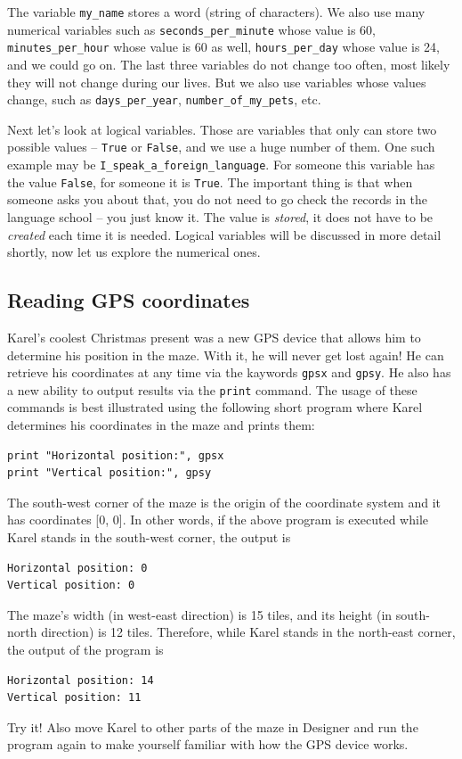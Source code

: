 The variable {\tt my\_name} stores a word (string of characters). We also use many numerical variables such as
{\tt seconds\_per\_minute} whose value is 60, {\tt minutes\_per\_hour} whose value is 60 as well, 
{\tt hours\_per\_day} whose value is 24, and we could go on. The last three variables do not change 
too often, most likely they will not change during our lives. But we also use variables whose 
values change, such as {\tt days\_per\_year}, {\tt number\_of\_my\_pets}, etc.

Next let's look at logical variables. Those are variables that only can store two possible values --
{\tt True} or {\tt False}, and we use a huge number of them. One such example may be {\tt I\_speak\_a\_foreign\_language}.
For someone this variable has the value {\tt False}, for someone it is {\tt True}. The important 
thing is that when someone asks you about that, you do not need to go check the records in the language 
school -- you just know it. The value is {\em stored}, it does not have to be {\em created} each time 
it is needed. Logical variables will be discussed in more detail shortly, now let us explore 
the numerical ones.

\subsection{Reading GPS coordinates}

Karel's coolest Christmas present was a new GPS device that allows him to determine his position 
in the maze. With it, he will never get lost again! He can retrieve his coordinates at any time via the 
kaywords {\tt gpsx} and {\tt gpsy}. He also has a new ability to output results via the {\tt print} 
command. The usage of these commands is best illustrated using the following short program where 
Karel determines his coordinates in the maze and prints them:

\begin{verbatim}
print "Horizontal position:", gpsx
print "Vertical position:", gpsy
\end{verbatim}
The south-west corner of the maze is the origin of the coordinate system and it has 
coordinates [0, 0]. In other words, if the above program is executed while Karel stands 
in the south-west corner, the output is

\begin{verbatim}
Horizontal position: 0
Vertical position: 0
\end{verbatim}
The maze's width (in west-east direction) is 15 tiles, and its height (in south-north direction) 
is 12 tiles. Therefore, while Karel stands in the north-east corner, the output of the program is
\begin{verbatim}
Horizontal position: 14
Vertical position: 11
\end{verbatim}
Try it! Also move Karel to other parts of the maze in Designer and run the program again
to make yourself familiar with how the GPS device works.

